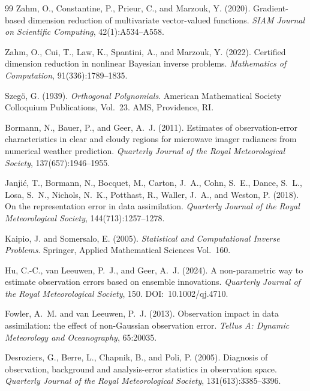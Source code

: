 \begin{thebibliography}{99}
Zahm, O., Constantine, P., Prieur, C., and Marzouk, Y. (2020).
Gradient-based dimension reduction of multivariate vector-valued functions.
\emph{SIAM Journal on Scientific Computing}, 42(1):A534--A558.

Zahm, O., Cui, T., Law, K., Spantini, A., and Marzouk, Y. (2022).
Certified dimension reduction in nonlinear Bayesian inverse problems.
\emph{Mathematics of Computation}, 91(336):1789--1835.

Szeg\"o, G. (1939).
\emph{Orthogonal Polynomials}.
American Mathematical Society Colloquium Publications, Vol.~23. AMS, Providence, RI.

Bormann, N., Bauer, P., and Geer, A.~J. (2011).
Estimates of observation-error characteristics in clear and cloudy regions for microwave imager radiances from numerical weather prediction.
\emph{Quarterly Journal of the Royal Meteorological Society}, 137(657):1946--1955.

Janji\'c, T., Bormann, N., Bocquet, M., Carton, J.~A., Cohn, S.~E., Dance, S.~L., Losa, S.~N., Nichols, N.~K., Potthast, R., Waller, J.~A., and Weston, P. (2018).
On the representation error in data assimilation.
\emph{Quarterly Journal of the Royal Meteorological Society}, 144(713):1257--1278.

Kaipio, J. and Somersalo, E. (2005).
\emph{Statistical and Computational Inverse Problems}.
Springer, Applied Mathematical Sciences Vol.~160.

Hu, C.-C., van Leeuwen, P.~J., and Geer, A.~J. (2024).
A non-parametric way to estimate observation errors based on ensemble innovations.
\emph{Quarterly Journal of the Royal Meteorological Society}, 150. \mbox{DOI: 10.1002/qj.4710}.

Fowler, A.~M. and van Leeuwen, P.~J. (2013).
Observation impact in data assimilation: the effect of non-Gaussian observation error.
\emph{Tellus A: Dynamic Meteorology and Oceanography}, 65:20035.

Desroziers, G., Berre, L., Chapnik, B., and Poli, P. (2005).
Diagnosis of observation, background and analysis-error statistics in observation space.
\emph{Quarterly Journal of the Royal Meteorological Society}, 131(613):3385--3396.


\end{thebibliography}
